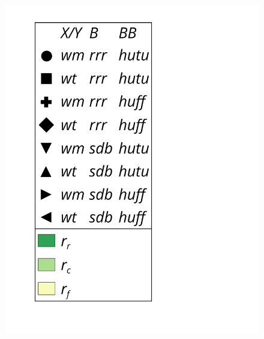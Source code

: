 \begin{figure}
\begin{minipage}{1\textwidth}
\begin{minipage}{0.45\textwidth}
\begin{minipage}{0.2\textwidth}
    				\includegraphics[scale=.16, clip, trim=70 0 0 0]{img/sdsl/label.pdf}
    			\end{minipage}
    			

\end{minipage}
\end{minipage}
\end{figure}
